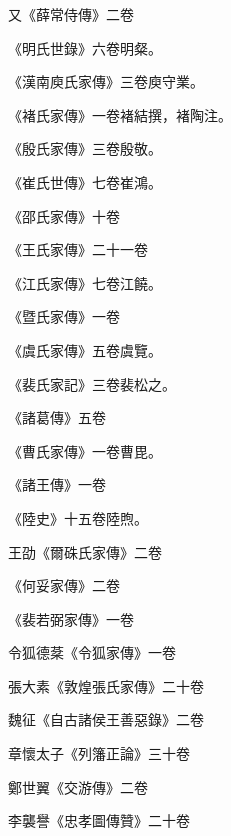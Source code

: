 \begin{pinyinscope}
 又《薛常侍傳》二卷



 《明氏世錄》六卷明粲。



 《漢南庾氏家傳》三卷庾守業。



 《褚氏家傳》一卷褚結撰，褚陶注。



 《殷氏家傳》三卷殷敬。



 《崔氏世傳》七卷崔鴻。



 《邵氏家傳》十卷



 《王氏家傳》二十一卷



 《江氏家傳》七卷江饒。



 《暨氏家傳》一卷



 《虞氏家傳》五卷虞覽。



 《裴氏家記》三卷裴松之。



 《諸葛傳》五卷



 《曹氏家傳》一卷曹毘。



 《諸王傳》一卷



 《陸史》十五卷陸煦。



 王劭《爾硃氏家傳》二卷



 《何妥家傳》二卷



 《裴若弼家傳》一卷



 令狐德棻《令狐家傳》一卷



 張大素《敦煌張氏家傳》二十卷



 魏征《自古諸侯王善惡錄》二卷



 章懷太子《列籓正論》三十卷



 鄭世翼《交游傳》二卷



 李襲譽《忠孝圖傳贊》二十卷




\end{pinyinscope}
